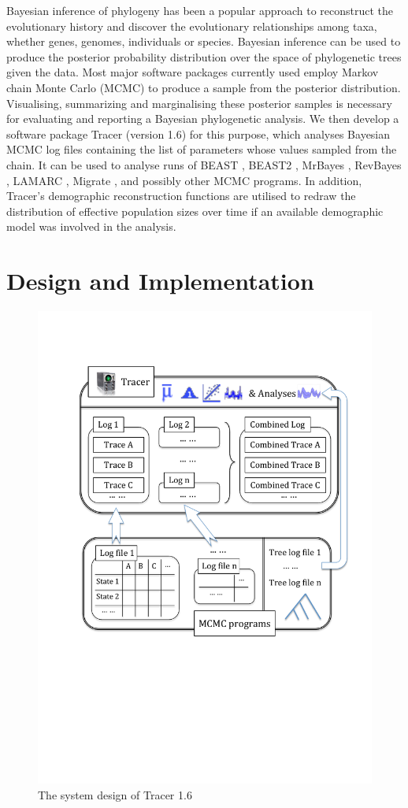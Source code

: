 \documentclass{bioinfo}
\begin{document}
Bayesian inference of phylogeny \citep{huelsenbeck2001bayesian, yang2006computational, DrummondBouckaert2015} has been a popular approach to reconstruct the evolutionary history and discover the evolutionary relationships among taxa, whether genes, genomes, individuals or species.
Bayesian inference can be used to produce the posterior probability distribution over the space of phylogenetic trees given the data. Most major software packages currently used employ Markov chain Monte Carlo (MCMC) to produce a sample from the posterior distribution.
Visualising, summarizing and marginalising these posterior samples is necessary for evaluating and reporting a Bayesian phylogenetic analysis.
We then develop a software package Tracer (version 1.6) for this purpose, which analyses Bayesian MCMC log files containing the list of parameters whose values sampled from the chain. 
It can be used to analyse runs of BEAST \citep{drummond2007beast,drummond2012bayesian}, BEAST2 \citep{bouckaert2014beast2}, MrBayes \citep{ronquist2012mrbayes}, RevBayes \citep{hohna2016revbayes}, LAMARC \citep{kuhner2006lamarc}, Migrate \citep{beerli2006comparison},  and possibly other MCMC programs.
In addition, Tracer's demographic reconstruction functions are utilised to redraw the distribution of effective population sizes over time if an available demographic model was involved in the analysis.



\section*{Design and Implementation}

\begin{figure}[ht]
\includegraphics[width=.38\textwidth]{./figures/tracer.pdf}  
\caption{The system design of Tracer 1.6}
\label{fig:tracer}
\end{figure}
\end{document}
